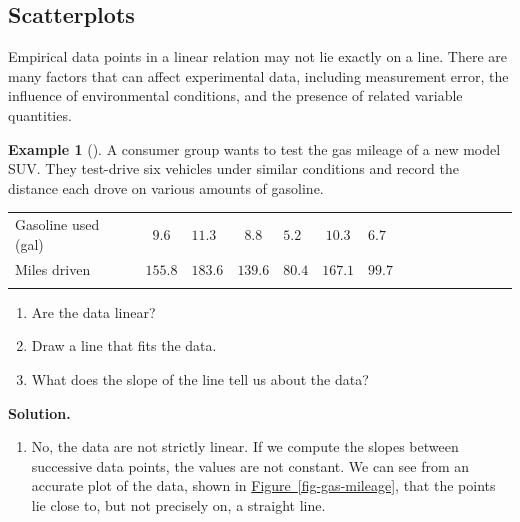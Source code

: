 \documentclass[10pt,]{book}
\theoremstyle{plain}
\theoremstyle{definition}
\theoremstyle{definition}
\newtheorem{example}[theorem]{Example}
\theoremstyle{definition}
\theoremstyle{definition}
\numberwithin{equation}{part}
\newcommand{\hrulethin}  {\noalign{\hrule height 0.04em}}
\newcommand{\hrulethick} {\noalign{\hrule height 0.11em}}
\newlength{\panelmax}
\begin{document}
\subsection[{Scatterplots}]{Scatterplots}\label{subsection-34}
Empirical data points in a linear relation may not lie exactly on a line. There are many factors that can affect experimental data, including measurement error, the influence of environmental conditions, and the presence of related variable quantities.%
\begin{example}[]\label{example-gas-mileage}
A consumer group wants to test the gas mileage of a new model SUV. They test-drive six vehicles under similar conditions and record the distance each drove on various amounts of gasoline. \leavevmode%
\begin{table}
\centering
\begin{tabular}{AcAcAcAcAcAcAcA}\hrulethick
Gasoline used (gal)&\(9.6\)&\(11.3\)&\(8.8\)&\(5.2\)&\(10.3\)&\(6.7\)\tabularnewline\hrulethin
Miles driven&\(155.8\)&\(183.6\)&\(139.6\)&\(80.4\)&\(167.1\)&\(99.7\)\tabularnewline\hrulethin
\end{tabular}
\end{table}
 \leavevmode%
\begin{enumerate}[label=*\alph**]
\item\hypertarget{li-1293}{}Are the data linear?%
\item\hypertarget{li-1294}{}Draw a line that fits the data.%
\item\hypertarget{li-1295}{}What does the slope of the line tell us about the data?%
\end{enumerate}
%
\par\medskip\noindent%
\textbf{Solution.}\quad \leavevmode%
\begin{enumerate}[label=*\alph**]
\item\hypertarget{li-1296}{}No, the data are not strictly linear. If we compute the slopes between successive data points, the values are not constant. We can see from an accurate plot of the data, shown in \hyperref[fig-gas-mileage]{Figure~\ref{fig-gas-mileage}}, that the points lie close to, but not precisely on, a straight line. %
{%
\setlength{\panelmax}{0pt}
\newsavebox{\panelboxHRimage}
}
\end{enumerate}
\end{example}
\end{document}
